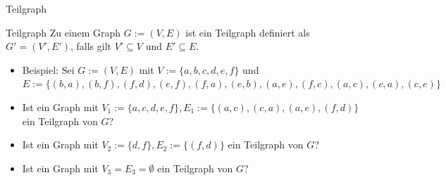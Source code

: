 \begin{frame}{Teilgraph}
	\begin{block}{Teilgraph}
		\ip Zu einem Graph $G := (V, E)$ \ip ist ein Teilgraph definiert \ip als $G' = (V', E')$\ip, falls gilt $V' \subseteq V$ und $E' \subseteq E$.
	\end{block}

	\bp	

	\begin{itemize}
		\item Beispiel: Sei $G := (V,E)$ mit $V := \{a,b,c,d,e,f\}$ und $E := \{(b,a),(b,f),(f,d),(e,f),(f,a),(e,b),(a,e),(f,c),(a,c),(c,a),(c,e)\}$
		\p\item Ist ein Graph mit $V_1:=\{a,c,d,e,f\}, E_1:= \{(a,c),(c,a),(a,e),(f,d)\}$ ein Teilgraph von $G$?
		\p\item Ist ein Graph mit $V_2:=\{d,f\}, E_2:= \{(f,d)\}$ ein Teilgraph von $G$?
		\p\item Ist ein Graph mit $V_3=E_3=\emptyset$ ein Teilgraph von $G$?
	\end{itemize}

	\bp
	

\end{frame}
